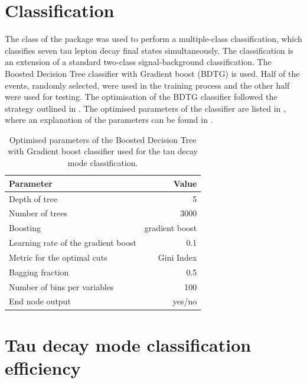 \section{Classification}
\label{sec:tauMVA}

The \multiclass class of the \TMVA package \cite{Therhaag:2009dp} was used to perform a multiple-class classification, which classifies seven tau lepton decay final states simultaneously. The \multiclass classification is an extension of a standard two-class signal-background classification. The Boosted Decision Tree classifier with Gradient boost (BDTG) is used. Half of the events, randomly selected, were used in the training process and the other half were used for testing. The optimisation of the BDTG classifier followed the strategy outlined in . The optimised parameters of the classifier are listed in , where an explanation of the parameters can be found in .




\begin{table}[!htbp]\centering
\begin{tabular}{lr}
\hline \hline
 Parameter &  Value \\
\hline
Depth of tree & 5 \\
Number of trees & 3000 \\
Boosting & gradient boost \\
Learning rate of the gradient boost & 0.1 \\
Metric for the optimal cuts & Gini Index \\
Bagging fraction & 0.5 \\
Number of bins per variables & 100 \\
End node output & yes/no \\
\hline \hline
\end{tabular}
\caption
{Optimised parameters of the Boosted Decision Tree with Gradient boost \multiclass classifier used for the tau decay mode classification.}
\label{tab:tauBDTparameters}
\end{table}


\section{Tau decay mode classification efficiency}
\label{sec:tauClassificationEff}

